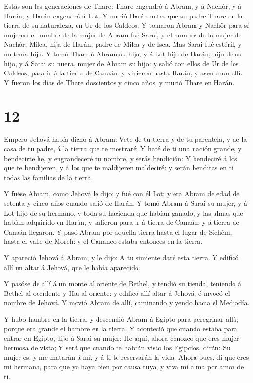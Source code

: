  Estas son las generaciones de Thare: Thare engendró á
Abram, y á Nachôr, y á Harán; y Harán engendró á Lot.  Y
murió Harán antes que su padre Thare en la tierra de su naturaleza, en
Ur de los Caldeos.  Y tomaron Abram y Nachôr para sí
mujeres: el nombre de la mujer de Abram fué Sarai, y el nombre de la
mujer de Nachôr, Milca, hija de Harán, padre de Milca y de Isca.
 Mas Sarai fué estéril, y no tenía hijo.  Y
tomó Thare á Abram su hijo, y á Lot hijo de Harán, hijo de su hijo, y á
Sarai su nuera, mujer de Abram su hijo: y salió con ellos de Ur de los
Caldeos, para ir á la tierra de Canaán: y vinieron hasta Harán, y
asentaron allí.  Y fueron los días de Thare doscientos y
cinco años; y murió Thare en Harán.

\hypertarget{section-11}{%
\section{12}\label{section-11}}

 Empero Jehová había dicho á Abram: Vete de tu tierra y de
tu parentela, y de la casa de tu padre, á la tierra que te mostraré;
 Y haré de ti una nación grande, y bendecirte he, y
engrandeceré tu nombre, y serás bendición:  Y bendeciré á
los que te bendijeren, y á los que te maldijeren maldeciré: y serán
benditas en ti todas las familias de la tierra.

 Y fuése Abram, como Jehová le dijo; y fué con él Lot: y era
Abram de edad de setenta y cinco años cuando salió de Harán.
 Y tomó Abram á Sarai su mujer, y á Lot hijo de su hermano,
y toda su hacienda que habían ganado, y las almas que habían adquirido
en Harán, y salieron para ir á tierra de Canaán; y á tierra de Canaán
llegaron.  Y pasó Abram por aquella tierra hasta el lugar de
Sichêm, hasta el valle de Moreh: y el Cananeo estaba entonces en la
tierra.

 Y apareció Jehová á Abram, y le dijo: A tu simiente daré
esta tierra. Y edificó allí un altar á Jehová, que le había aparecido.

 Y pasóse de allí á un monte al oriente de Bethel, y tendió
su tienda, teniendo á Bethel al occidente y Hai al oriente: y edificó
allí altar á Jehová, é invocó el nombre de Jehová.  Y movió
Abram de allí, caminando y yendo hacia el Mediodía.

 Y hubo hambre en la tierra, y descendió Abram á Egipto
para peregrinar allá; porque era grande el hambre en la tierra.
 Y aconteció que cuando estaba para entrar en Egipto, dijo
á Sarai su mujer: He aquí, ahora conozco que eres mujer hermosa de
vista;  Y será que cuando te habrán visto los Egipcios,
dirán: Su mujer es: y me matarán á mí, y á ti te reservarán la vida.
 Ahora pues, di que eres mi hermana, para que yo haya bien
por causa tuya, y viva mi alma por amor de ti.


